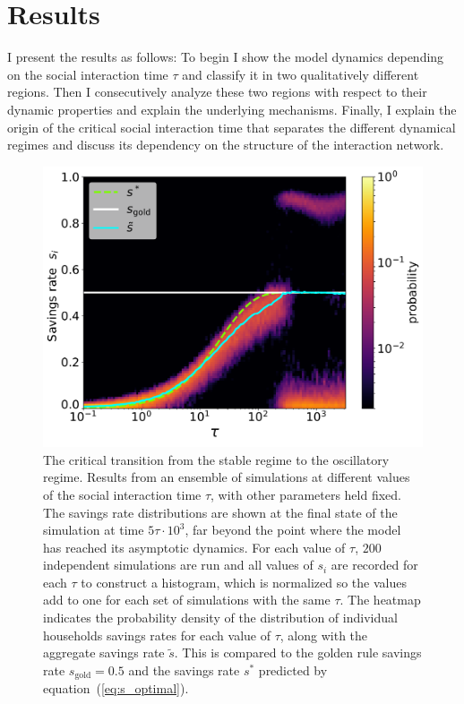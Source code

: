 \section{Results}
\label{sec:savings_results}
I present the results as follows: To begin I show the model dynamics depending on the social interaction time $\tau$ and classify it in two qualitatively different regions. Then I consecutively analyze these two regions with respect to their dynamic properties and explain the underlying mechanisms. Finally, I explain the origin of the critical social interaction time that separates the different dynamical regimes and discuss its dependency on the structure of the interaction network.\\
\begin{figure}[ht]
     \centering
     \vspace{-.2 cm}
     \includegraphics[width=.9\linewidth]{figures/fig1.pdf}
	\caption []{{ The critical transition from the stable regime to the oscillatory regime.} 
	 Results from an ensemble of simulations at different values of the social interaction time $\tau$, with other parameters held fixed. The savings rate distributions are shown at the final state of the simulation at time $5\tau \cdot 10^3$, far beyond the point where the model has reached its asymptotic dynamics. For each value of $\tau$, $200$ independent simulations are run and all values of $s_i$ are recorded for each $\tau$ to construct a histogram, which is normalized so  the values add to one for each set of simulations with the same $\tau$.
 The heatmap indicates the probability density of the distribution of individual households savings rates for each value of $\tau$, along with the aggregate savings rate $\tilde{s}$. This is compared to the golden rule savings rate $s_\mathrm{gold} \! = 0.5$ and the savings rate $s^*$ predicted by equation~(\ref{eq:s_optimal}).}
	
   \label{phase}
\end{figure}
